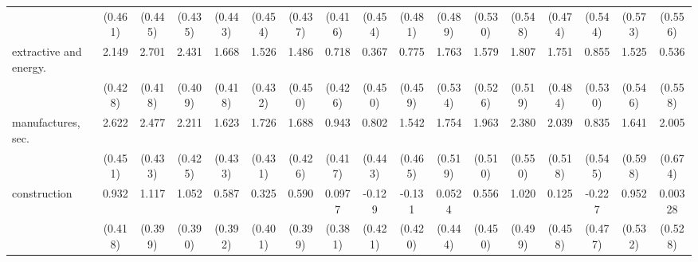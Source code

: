 {\begin{tabular}{l*{16}{c}}
                    &     (0.461)         &     (0.445)         &     (0.435)         &     (0.443)         &     (0.454)         &     (0.437)         &     (0.416)         &     (0.454)         &     (0.481)         &     (0.489)         &     (0.530)         &     (0.548)         &     (0.474)         &     (0.544)         &     (0.573)         &     (0.556)         \\
[1em]
extractive and energy.&       2.149\sym{***}&       2.701\sym{***}&       2.431\sym{***}&       1.668\sym{***}&       1.526\sym{***}&       1.486\sym{***}&       0.718         &       0.367         &       0.775         &       1.763\sym{***}&       1.579\sym{**} &       1.807\sym{***}&       1.751\sym{***}&       0.855         &       1.525\sym{**} &       0.536         \\
                    &     (0.428)         &     (0.418)         &     (0.409)         &     (0.418)         &     (0.432)         &     (0.450)         &     (0.426)         &     (0.450)         &     (0.459)         &     (0.534)         &     (0.526)         &     (0.519)         &     (0.484)         &     (0.530)         &     (0.546)         &     (0.558)         \\
[1em]
manufactures, sec.  &       2.622\sym{***}&       2.477\sym{***}&       2.211\sym{***}&       1.623\sym{***}&       1.726\sym{***}&       1.688\sym{***}&       0.943\sym{*}  &       0.802         &       1.542\sym{***}&       1.754\sym{***}&       1.963\sym{***}&       2.380\sym{***}&       2.039\sym{***}&       0.835         &       1.641\sym{**} &       2.005\sym{**} \\
                    &     (0.451)         &     (0.433)         &     (0.425)         &     (0.433)         &     (0.431)         &     (0.426)         &     (0.417)         &     (0.443)         &     (0.465)         &     (0.519)         &     (0.510)         &     (0.550)         &     (0.518)         &     (0.545)         &     (0.598)         &     (0.674)         \\
[1em]
construction        &       0.932\sym{*}  &       1.117\sym{**} &       1.052\sym{**} &       0.587         &       0.325         &       0.590         &      0.0977         &      -0.129         &      -0.131         &      0.0524         &       0.556         &       1.020\sym{*}  &       0.125         &      -0.227         &       0.952         &     0.00328         \\
                    &     (0.418)         &     (0.399)         &     (0.390)         &     (0.392)         &     (0.401)         &     (0.399)         &     (0.381)         &     (0.421)         &     (0.420)         &     (0.444)         &     (0.450)         &     (0.499)         &     (0.458)         &     (0.477)         &     (0.532)         &     (0.528)         \\

\end{tabular}}
